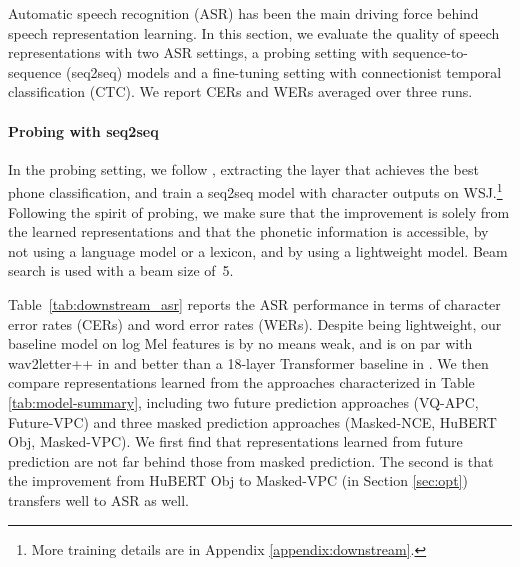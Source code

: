 Automatic speech recognition (ASR) has been the main driving force behind speech representation 
learning. In this section, we evaluate the quality of speech representations with two ASR settings, a probing setting with sequence-to-sequence (seq2seq) models and a fine-tuning setting with connectionist temporal classification (CTC).
We report CERs and WERs averaged over three runs. 

\paragraph{Probing with seq2seq}

In the probing setting, we follow \citet{yang2022autoregressive}, extracting the layer that achieves the best phone classification, and train a seq2seq model with character outputs on WSJ.\footnote{
More training details are in Appendix \ref{appendix:downstream}.}
Following the spirit of probing, we make sure that the improvement is solely from the learned representations 
and that the phonetic information is accessible, by not using a language model or a lexicon,
and by using a lightweight model.
Beam search is used with a beam size of~5.

Table~\ref{tab:downstream_asr} reports the ASR performance in terms of character error rates (CERs) and word error rates (WERs).
Despite being lightweight, our baseline model on log Mel features is by no means weak, and is on par with wav2letter++ in \citet{8683535} and 
better than a 18-layer Transformer baseline in \citet{higuchi2020mask}.
We then compare representations learned from the approaches characterized in Table \ref{tab:model-summary}, including two future prediction approaches (VQ-APC, Future-VPC) and three masked prediction approaches (Masked-NCE, HuBERT Obj, Masked-VPC).
We first find that representations learned from future prediction are not far behind those from masked prediction.
The second is that the improvement from HuBERT Obj to Masked-VPC (in Section \ref{sec:opt}) transfers well to ASR as well.


